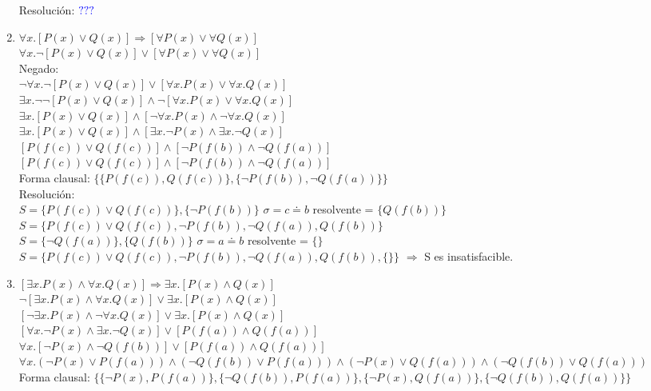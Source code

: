 \documentclass[10pt,a4paper]{article}
\begin{document}
\begin{enumerate}
Resolución: ${\color{blue}???}$
\item
$ \forall x. [P(x) \vee Q(x)] \Rightarrow [\forall P(x) \vee \forall Q(x)]$ \\
$ \forall x. \neg [P(x) \vee Q(x)] \vee [\forall P(x) \vee \forall Q(x)]$ \\
Negado: \\
$ \neg \forall x. \neg [P(x) \vee Q(x)] \vee [\forall x. P(x) \vee \forall x. Q(x)]$ \\
$ \exists x. \neg \neg [P(x) \vee Q(x)] \wedge \neg [\forall x. P(x) \vee \forall x. Q(x)]$ \\
$ \exists x. [P(x) \vee Q(x)] \wedge [\neg \forall x. P(x) \wedge \neg \forall x. Q(x)]$ \\
$ \exists x. [P(x) \vee Q(x)] \wedge [\exists x. \neg P(x) \wedge \exists x. \neg Q(x)]$ \\
$ [P(f(c)) \vee Q(f(c))] \wedge [\neg P(f(b)) \wedge \neg Q(f(a))]$ \\
$ [P(f(c)) \vee Q(f(c))] \wedge [\neg P(f(b)) \wedge \neg Q(f(a))]$ \\
Forma clausal: $\{ \{P(f(c)), Q(f(c))\}, \{\neg P(f(b)), \neg Q(f(a))\} \}$ \\
Resolución:\\
$S=\{P(f(c)) \vee Q(f(c))\},\{\neg P(f(b))\}$ $\sigma= c \doteq b$ resolvente = $\{Q(f(b))\}$ \\
$S=\{ P(f(c)) \vee Q(f(c)), \neg P(f(b)), \neg Q(f(a)), Q(f(b)) \}$ \\
$S=\{ \neg Q(f(a))\},\{Q(f(b)) \}$ $ \sigma= a \doteq b$ resolvente = $ \{\} $
$S=\{ P(f(c)) \vee Q(f(c)), \neg P(f(b)), \neg Q(f(a)), Q(f(b)), \{\} \}$ $\Rightarrow$ S es insatisfacible.
\item
$ [\exists x. P(x) \wedge \forall x. Q(x)] \Rightarrow \exists x. [P(x) \wedge Q(x)] $ \\
$ \neg [\exists x. P(x) \wedge \forall x. Q(x)] \vee \exists x. [P(x) \wedge Q(x)] $ \\
$ [\neg \exists x. P(x) \wedge \neg \forall x. Q(x)] \vee \exists x. [P(x) \wedge Q(x)] $ \\
$ [\forall x. \neg P(x) \wedge \exists x. \neg Q(x)] \vee [P(f(a)) \wedge Q(f(a))] $ \\
$ \forall x. [\neg P(x) \wedge \neg Q(f(b))] \vee [P(f(a)) \wedge Q(f(a))] $ \\
$ \forall x. (\neg P(x) \vee P(f(a))) \wedge (\neg Q(f(b)) \vee P(f(a))) \wedge (\neg P(x)\vee Q(f(a))) \wedge (\neg Q(f(b)) \vee Q(f(a))) $ \\
Forma clausal: $\{ \{\neg P(x), P(f(a))\}, \{\neg Q(f(b)), P(f(a))\}, \{\neg P(x), Q(f(a))\}, \{\neg Q(f(b)), Q(f(a))\}\}$

\end{enumerate}
\end{document}
